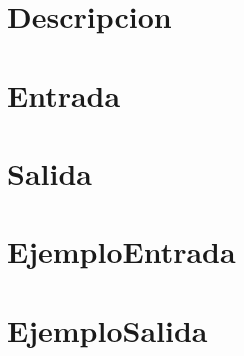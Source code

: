 \documentclass{article}
\begin{document}
\section*{Descripcion}

\section*{Entrada}

\section*{Salida}

\section*{EjemploEntrada}
\texttt{}
\section*{EjemploSalida}
\texttt{}
\end{document}
